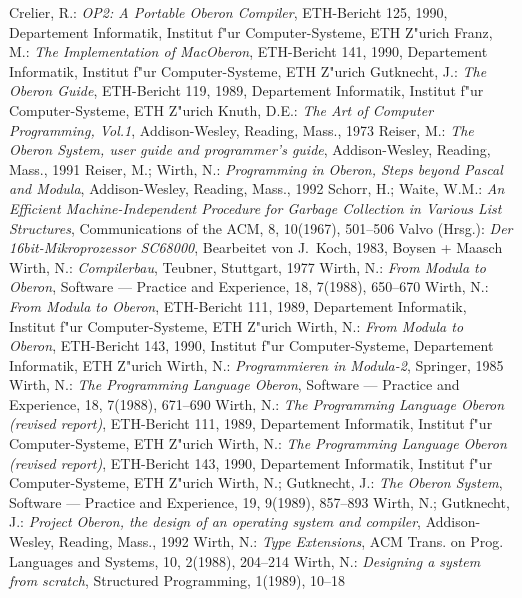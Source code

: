 \begin{thebibliography}{999999999999999}
  Crelier, R.: {\it OP2: A Portable Oberon Compiler},
  ETH-Bericht 125, 1990, Departement Informatik, Institut f"ur Computer-Systeme,
  ETH Z"urich
  Franz, M.: {\it The Implementation of MacOberon},
  ETH-Bericht 141, 1990, Departement Informatik, Institut f"ur Computer-Systeme,
  ETH Z"urich
  Gutknecht, J.: {\it The Oberon Guide},
  ETH-Bericht 119, 1989, Departement Informatik, Institut f"ur Computer-Systeme,
  ETH Z"urich
  Knuth, D.E.: {\it The Art of Computer Programming, Vol.1},
    Addison-Wesley, Reading, Mass., 1973
	Reiser, M.: {\it The Oberon System, user guide and programmer's guide},
	Addison-Wesley, Reading, Mass., 1991
	Reiser, M.; Wirth, N.: {\it Programming in Oberon, Steps beyond Pascal and
	Modula},
	Addison-Wesley, Reading, Mass., 1992
  Schorr, H.; Waite, W.M.: {\it An Efficient Machine-Independent
    Procedure for Garbage Collection in Various List Structures},
    Communications of the ACM, 8, 10(1967), 501--506
  Valvo (Hrsg.): {\it Der 16bit-Mikroprozessor SC68000},
  Bearbeitet von J.~Koch, 1983, Boysen + Maasch
  Wirth, N.: {\it Compilerbau}, Teubner, Stuttgart, 1977
  Wirth, N.: {\it From Modula to Oberon}, Software --- Practice and
  Experience, 18, 7(1988), 650--670
  Wirth, N.: {\it From Modula to Oberon},
  ETH-Bericht 111, 1989, Departement Informatik, Institut f"ur Computer-Systeme,
  ETH Z"urich
  Wirth, N.: {\it From Modula to Oberon},
  ETH-Bericht 143, 1990, Institut f"ur Computer-Systeme, Departement Informatik,
  ETH Z"urich
  Wirth, N.: {\it Programmieren in Modula-2}, Springer, 1985
  Wirth, N.: {\it The Programming Language Oberon},
  Software --- Practice and Experience, 18, 7(1988), 671--690
  Wirth, N.: {\it The Programming Language Oberon (revised report)},
  ETH-Bericht 111, 1989, Departement Informatik, Institut f"ur Computer-Systeme,
  ETH Z"urich
  Wirth, N.: {\it The Programming Language Oberon (revised report)},
  ETH-Bericht 143, 1990, Departement Informatik, Institut f"ur Computer-Systeme,
  ETH Z"urich
  Wirth, N.; Gutknecht, J.: {\it The Oberon System},
  Software --- Practice and Experience, 19, 9(1989), 857--893
	Wirth, N.; Gutknecht, J.: {\it Project Oberon, the design of an operating system
	and compiler},
	Addison-Wesley, Reading, Mass., 1992
  Wirth, N.: {\it Type Extensions},
  ACM Trans. on Prog. Languages and Systems, 10, 2(1988), 204--214
  Wirth, N.: {\it Designing a system from scratch},
  Structured Programming, 1(1989), 10--18
\end{thebibliography}

